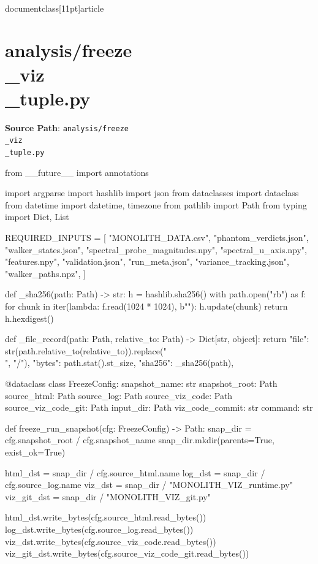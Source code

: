 \\documentclass[11pt]{article}
\begin{document}
\section*{analysis/freeze\\_viz\\_tuple.py}
\textbf{Source Path}: \texttt{analysis/freeze\\_viz\\_tuple.py}\par
\bigskip
\begin{CodeBlock}
from __future__ import annotations

import argparse
import hashlib
import json
from dataclasses import dataclass
from datetime import datetime, timezone
from pathlib import Path
from typing import Dict, List

REQUIRED_INPUTS = [
    "MONOLITH_DATA.csv",
    "phantom_verdicts.json",
    "walker_states.json",
    "spectral_probe_magnitudes.npy",
    "spectral_u_axis.npy",
    "features.npy",
    "validation.json",
    "run_meta.json",
    "variance_tracking.json",
    "walker_paths.npz",
]


def _sha256(path: Path) -> str:
    h = hashlib.sha256()
    with path.open("rb") as f:
        for chunk in iter(lambda: f.read(1024 * 1024), b""):
            h.update(chunk)
    return h.hexdigest()


def _file_record(path: Path, relative_to: Path) -> Dict[str, object]:
    return {
        "file": str(path.relative_to(relative_to)).replace("\\", "/"),
        "bytes": path.stat().st_size,
        "sha256": _sha256(path),
    }


@dataclass
class FreezeConfig:
    snapshot_name: str
    snapshot_root: Path
    source_html: Path
    source_log: Path
    source_viz_code: Path
    source_viz_code_git: Path
    input_dir: Path
    viz_code_commit: str
    command: str


def freeze_run_snapshot(cfg: FreezeConfig) -> Path:
    snap_dir = cfg.snapshot_root / cfg.snapshot_name
    snap_dir.mkdir(parents=True, exist_ok=True)

    html_dst = snap_dir / cfg.source_html.name
    log_dst = snap_dir / cfg.source_log.name
    viz_dst = snap_dir / "MONOLITH_VIZ_runtime.py"
    viz_git_dst = snap_dir / "MONOLITH_VIZ_git.py"

    html_dst.write_bytes(cfg.source_html.read_bytes())
    log_dst.write_bytes(cfg.source_log.read_bytes())
    viz_dst.write_bytes(cfg.source_viz_code.read_bytes())
    viz_git_dst.write_bytes(cfg.source_viz_code_git.read_bytes())


\end{CodeBlock}
\end{document}
